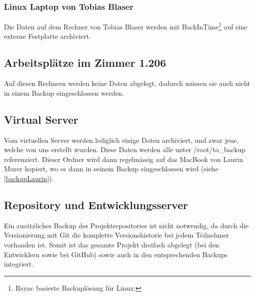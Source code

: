 			\subsubsection{Linux Laptop von Tobias Blaser}
				Die Daten auf dem Rechner von Tobias Blaser werden mit BackInTime\footnote{Rsync basierte Backuplösung für Linux: } auf eine externe Festplatte archiviert.
				
		\subsection{Arbeitsplätze im Zimmer 1.206}
			Auf diesen Rechnern werden keine Daten abgelegt, dadurch müssen sie auch nicht in einem Backup eingeschlossen werden.

		\subsection{Virtual Server}
			Vom virtuellen Server werden lediglich einige Daten archiviert, und zwar jene, welche von uns erstellt wurden.
			Diese Daten werden alle unter /root/to\_backup referenziert.
			Dieser Ordner wird dann regelmässig auf das MacBook von Laurin Murer kopiert, wo es dann in seinem Backup eingeschlossen wird (siehe \ref{backupLaurin}).
		
		\subsection{Repository und Entwicklungsserver}
			Ein zusätzliches Backup des Projektrepositories ist nicht notwendig, da durch die Versionierung mit Git die komplette Versionshistorie bei jedem Teilnehmer vorhanden ist.
			Somit ist das gesamte Projekt dreifach abgelegt (bei den Entwicklern sowie bei GitHub) sowie auch in den entsprechenden Backups integriert.

